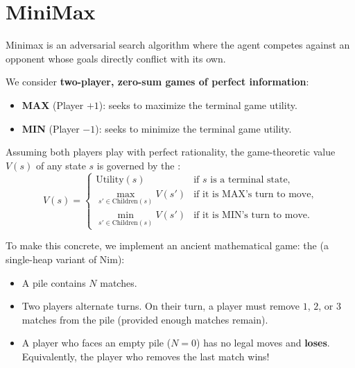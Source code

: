 \section{MiniMax}
Minimax is an adversarial search algorithm where the agent competes against an opponent whose goals directly conflict with its own.

We consider \textbf{two-player, zero-sum games of perfect information}:
\begin{itemize}
    \item \textbf{MAX} (Player $+1$): seeks to maximize the terminal game utility.
    \item \textbf{MIN} (Player $-1$): seeks to minimize the terminal game utility.
\end{itemize}

Assuming both players play with perfect rationality, the game-theoretic value $V(s)$ of any state $s$ is governed by the :
\[
V(s) = \begin{cases}
\text{Utility}(s) & \text{if } s \text{ is a terminal state,} \\
\max_{s' \in \text{Children}(s)} V(s') & \text{if it is MAX's turn to move,} \\
\min_{s' \in \text{Children}(s)} V(s') & \text{if it is MIN's turn to move.}
\end{cases}
\]

To make this concrete, we implement an ancient mathematical game: the  (a single-heap variant of Nim):
\begin{itemize}
    \item A pile contains $N$ matches.
    \item Two players alternate turns. On their turn, a player must remove $1$, $2$, or $3$ matches from the pile (provided enough matches remain).
    \item A player who faces an empty pile ($N = 0$) has no legal moves and \textbf{loses}. Equivalently, the player who removes the last match wins!
\end{itemize}




